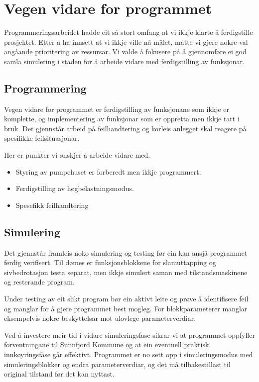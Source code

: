 \section{Vegen vidare for programmet}
\thispagestyle{fancy}

Programmeringsarbeidet hadde eit så stort omfang at vi ikkje klarte å ferdigstille prosjektet.
Etter å ha innsett at vi ikkje ville nå målet, måtte vi gjere nokre val angåande prioritering av ressursar. 
Vi valde å fokusere på å gjennomføre ei god samla simulering i staden for å arbeide vidare med ferdigstilling av funksjonar.

\subsection{Programmering}

Vegen vidare for programmet er ferdigstilling av funksjonane som ikkje er komplette, og 
implementering av funksjonar som er oppretta men ikkje tatt i bruk. 
Det gjennstår arbeid på feilhandtering og korleis anlegget skal reagere på spesifikke feilsituasjonar.

Her er punkter vi ønskjer å arbeide vidare med.

\begin{itemize}
    \item Styring av pumpehuset er forberedt men ikkje programmert. 
    \item Ferdigstilling av høgbelastningsmodus.
    \item Spesefikk feilhandtering
\end{itemize}

\subsection{Simulering}

Det gjennstår framleis noko simulering og testing før ein kan ansjå programmet ferdig verifisert.
Til dømes er funksjonsblokkene for slamuttapping og sivbedrotasjon testa separat, men ikkje simulert saman med
tilstandsmaskinene og resterande program.

Under testing av eit slikt program bør ein aktivt leite og prøve å identifisere feil og manglar for å gjere programmet best mogleg.
For blokkparameterer manglar eksempelvis nokre beskyttelsar mot ulovlege parameterverdiar.

Ved å investere meir tid i vidare simuleringsfase sikrar vi at programmet oppfyller forventningane til \gls{Sunnfjord Kommune} og at ein eventuell
praktisk innkøyringsfase går effektivt. \newline
Programmet er no sett opp i simuleringsmodus med simuleringsblokker og endra parameterverdiar, 
og det må tilbakestillast til original tilstand før det kan nyttast. 




\newpage